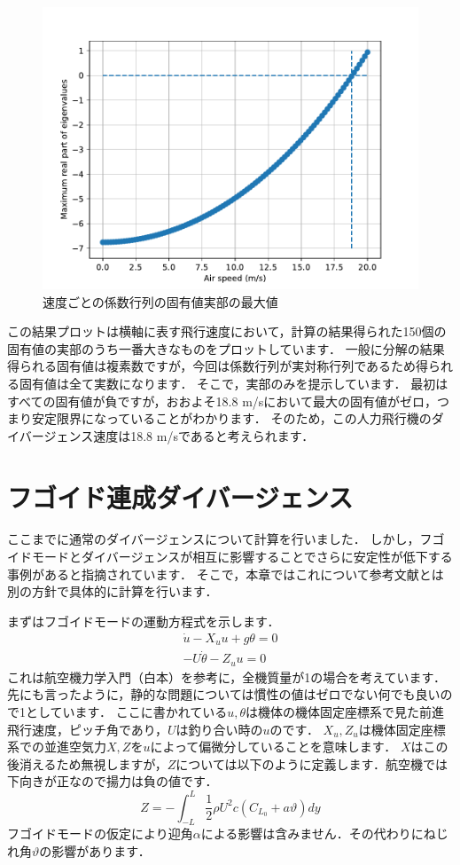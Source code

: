 \documentclass{jarticle}
\begin{document}
\begin{figure}[H]
    \centering
    \includegraphics[width=0.8\linewidth]{image/Eigenvalues_of_divergence.pdf}
    \caption{速度ごとの係数行列の固有値実部の最大値}
    \label{eigen1}
\end{figure}

この結果プロットは横軸に表す飛行速度において，計算の結果得られた150個の固有値の実部のうち一番大きなものをプロットしています．
一般に分解の結果得られる固有値は複素数ですが，今回は係数行列が実対称行列であるため得られる固有値は全て実数になります．
そこで，実部のみを提示しています．
最初はすべての固有値が負ですが，おおよそ18.8 m/sにおいて最大の固有値がゼロ，つまり安定限界になっていることがわかります．
そのため，この人力飛行機のダイバージェンス速度は18.8 m/sであると考えられます．

\section{フゴイド連成ダイバージェンス}

ここまでに通常のダイバージェンスについて計算を行いました．
しかし，フゴイドモードとダイバージェンスが相互に影響することでさらに安定性が低下する事例があると指摘されています\cite{takasaki}．
そこで，本章ではこれについて参考文献とは別の方針で具体的に計算を行います．

まずはフゴイドモードの運動方程式を示します．
\begin{align} 
    \dot{u} - X_u u + g \theta = 0\\
    -U\dot{\theta} - Z_u u = 0
\end{align}
これは航空機力学入門（白本）\cite{sirohon}を参考に，全機質量が1の場合を考えています．先にも言ったように，静的な問題については慣性の値はゼロでない何でも良いので1としています．
ここに書かれている$u,\theta$は機体の機体固定座標系で見た前進飛行速度，ピッチ角であり，$U$は釣り合い時の$u$のです．
$X_u,Z_u$は機体固定座標系での並進空気力$X,Z$を$u$によって偏微分していることを意味します．
$X$はこの後消えるため無視しますが，$Z$については以下のように定義します．航空機では下向きが正なので揚力は負の値です．
\begin{equation}
    Z = -\int_{-L}^L \frac{1}{2}\rho U^2 c (C_{L_0} + a\vartheta) dy
\end{equation}
フゴイドモードの仮定により迎角$\alpha$による影響は含みません．その代わりにねじれ角$\vartheta$の影響があります．
\end{document}
